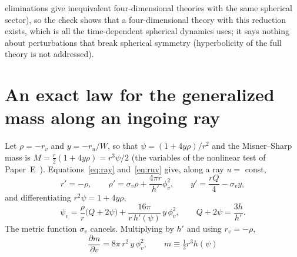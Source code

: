 \documentclass[11pt]{article}
\begin{document}
eliminations give inequivalent four-dimensional theories with the same spherical sector), so the check shows that a four-dimensional theory with this reduction exists, which is all the time-dependent spherical dynamics uses; it says nothing about perturbations that break spherical symmetry (hyperbolicity of the full theory is not addressed).

\section{An exact law for the generalized mass along an ingoing ray}
\label{sec:ray}

Let $\rho=-r_v$ and $y=-r_u/W$, so that $\psi=(1+4y\rho)/r^{2}$ and the Misner--Sharp mass is $M=\tfrac r2(1+4y\rho)=r^{3}\psi/2$ (the variables of the nonlinear test of Paper~E~\citep{PaperE}). Equations~\eqref{eq:ray} and~\eqref{eq:ruv} give, along a ray $u=$ const,
\begin{equation}
r'=-\rho,\qquad \rho'=\sigma_v\rho+\frac{4\pi r}{h'}\phi_v^{2},\qquad y'=\frac{rQ}{4}-\sigma_vy,
\label{eq:rayodes}
\end{equation}
and differentiating $r^{2}\psi=1+4y\rho$,
\begin{equation}
\psi_v=\frac{\rho}{r}\bigl(Q+2\psi\bigr)+\frac{16\pi}{r\,h'(\psi)}\,y\,\phi_v^{2},\qquad Q+2\psi=\frac{3h}{h'} .
\label{eq:psiv}
\end{equation}
The metric function $\sigma_v$ cancels. Multiplying by $h'$ and using $r_v=-\rho$,
\begin{equation}
\boxed{\;\frac{\partial m}{\partial v}=8\pi\,r^{2}\,y\,\phi_v^{2},\qquad m\equiv\tfrac12r^{3}h(\psi)\;}
\label{eq:mlaw}
\end{equation}
\end{document}
